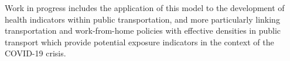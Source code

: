 \documentclass[3p,times,procedia]{elsarticle}
\begin{document}
Work in progress includes the application of this model to the development of health indicators within public transportation, and more particularly linking transportation and work-from-home policies with effective densities in public transport which provide potential exposure indicators in the context of the COVID-19 crisis.














%
\newpage




\clearpage
\end{document}
